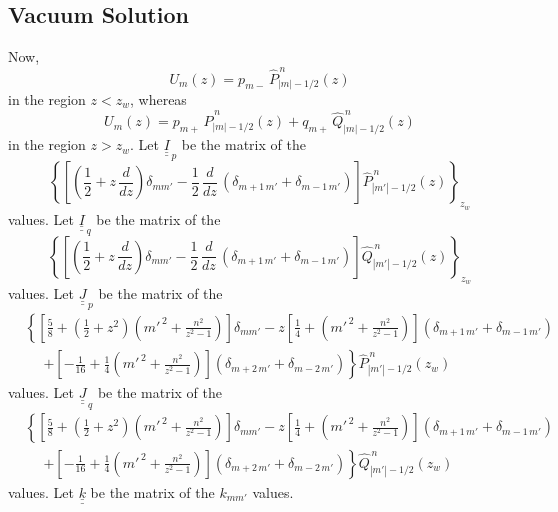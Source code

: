\documentclass[12pt,prb,aps,notitlepage]{revtex4-1}
\begin{document}
\subsection{Vacuum Solution}
Now, 
\begin{equation}
U_m(z) = p_{m-}\,\hat{P}_{|m|-1/2}^{\,n}(z)
\end{equation}
in the region $z<z_w$, whereas 
\begin{equation}
U_m(z) =p_{m+}\,\hat{P}_{|m|-1/2}^{\,n}(z) + q_{m+}\,\hat{Q}_{|m|-1/2}^{\,n}(z) 
\end{equation}
in the region $z>z_w$. 
Let $\underline{\underline{I}}_{\,p}$ be the matrix of the
\begin{equation}
\left\{\left[\left(\frac{1}{2}+z\,\frac{d}{dz}\right)\delta_{mm'}-\frac{1}{2}\,\frac{d}{dz}\,(\delta_{m+1\,m'}+\delta_{m-1\,m'})\right]\hat{P}_{|m'|-1/2}^{\,n}(z)\right\}_{z_w}
\end{equation}
values.
Let $\underline{\underline{I}}_{\,q}$ be the matrix of the
\begin{equation}
\left\{\left[\left(\frac{1}{2}+z\,\frac{d}{dz}\right)\delta_{mm'}-\frac{1}{2}\,\frac{d}{dz}\,(\delta_{m+1\,m'}+\delta_{m-1\,m'})\right]\hat{Q}_{|m'|-1/2}^{\,n}(z)\right\}_{z_w}
\end{equation}
values. 
Let $\underline{\underline{J}}_{\,p}$ be the matrix of the 
\begin{align}
 &\left\{\left[\frac{5}{8} + \left(\frac{1}{2}+z^2\right)\left(m'^{\,2}+\frac{n^2}{z^2-1}\right)\right]\delta_{mm'}
-z\left[\frac{1}{4}+ \left(m'^{\,2}+\frac{n^2}{z^2-1}\right)\right](\delta_{m+1\,m'}+\delta_{m-1\,m'})\right.\nonumber\\[0.5ex]
&\phantom{=}\left.+\left[-\frac{1}{16}+\frac{1}{4} \left(m'^{\,2}+\frac{n^2}{z^2-1}\right)\right](\delta_{m+2\,m'}+\delta_{m-2\,m'})\right\}\hat{P}_{|m'|-1/2}^{\,n}(z_w)
\end{align}
values. Let $\underline{\underline{J}}_{\,q}$ be the matrix of the 
\begin{align}
 &\left\{\left[\frac{5}{8} + \left(\frac{1}{2}+z^2\right)\left(m'^{\,2}+\frac{n^2}{z^2-1}\right)\right]\delta_{mm'}
-z\left[\frac{1}{4}+ \left(m'^{\,2}+\frac{n^2}{z^2-1}\right)\right](\delta_{m+1\,m'}+\delta_{m-1\,m'})\right.\nonumber\\[0.5ex]
&\phantom{=}\left.+\left[-\frac{1}{16}+\frac{1}{4} \left(m'^{\,2}+\frac{n^2}{z^2-1}\right)\right](\delta_{m+2\,m'}+\delta_{m-2\,m'})\right\}\hat{Q}_{|m'|-1/2}^{\,n}(z_w)
\end{align}
values. 
Let $\underline{\underline{k}}$ be the matrix of the $k_{mm'}$ values. 
\end{document}
